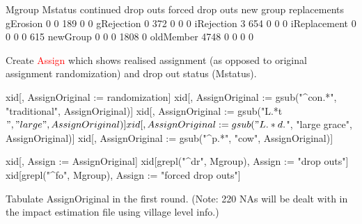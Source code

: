 \begin{Schunk}
\begin{Soutput}
              Mgroup
Mstatus        continued drop outs forced drop outs new group replacements
  gErosion             0         0              189         0            0
  gRejection           0       372                0         0            0
  iRejection           3       654                0         0            0
  iReplacement         0         0                0         0          615
  newGroup             0         0                0      1808            0
  oldMember         4748         0                0         0            0
\end{Soutput}
\end{Schunk}
Create \textcolor{red}{\textsf{Assign}} which shows realised assignment (as opposed to original assignment \textsf{randomization}) and drop out status (\textsf{Mstatus}).
\begin{Schunk}
\begin{Sinput}
xid[, AssignOriginal := randomization]
xid[, AssignOriginal := gsub("^con.*", "traditional", AssignOriginal)]
xid[, AssignOriginal := gsub("L.*t$", "large", AssignOriginal)]
xid[, AssignOriginal := gsub("L.*d.$", "large grace", AssignOriginal)]
xid[, AssignOriginal := gsub("^p.*", "cow", AssignOriginal)]
\end{Sinput}
\end{Schunk}
\begin{Schunk}
\begin{Sinput}
xid[, Assign := AssignOriginal]
xid[grepl("^dr", Mgroup), Assign := "drop outs"]
xid[grepl("^fo", Mgroup), Assign := "forced drop outs"]
\end{Sinput}
\end{Schunk}
Tabulate \textsf{AssignOriginal} in the first round. (Note: 220 NAs will be dealt with in the impact estimation file using village level info.)
